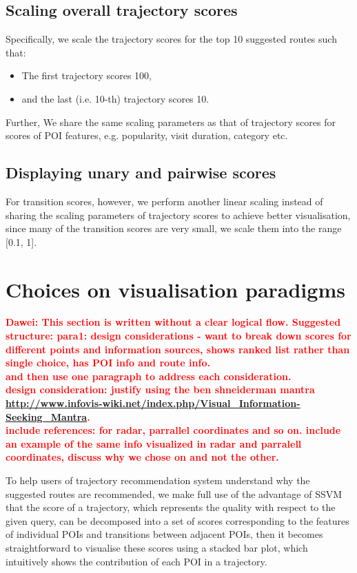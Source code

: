 \documentclass[sigconf]{acmart}
\newcommand{\TODO}[1]{\textcolor{red}{\bf{#1}}}
\begin{document}
\subsection{Scaling overall trajectory scores}
Specifically, we scale the trajectory scores for the top 10 suggested routes such that:
\begin{itemize}
\item The first trajectory scores 100,
\item and the last (i.e. 10-th) trajectory scores 10.
\end{itemize}
Further, 
We share the same scaling parameters as that of trajectory scores for scores of POI features, e.g. popularity, visit duration, category etc.

\subsection{Displaying unary and pairwise scores}

For transition scores, however, 
we perform another linear scaling instead of sharing the scaling parameters of trajectory scores to achieve better visualisation,
since many of the transition scores are very small, we scale them into the range [0.1, 1].



\section{Choices on visualisation paradigms}

\TODO{Dawei: This section is written without a clear logical flow. Suggested structure:
para1: design considerations - want to break down scores for different points and information sources, shows ranked list rather than single choice, has POI info and route info.\\
and then use one paragraph to address each consideration. \\
design consideration: justify using the ben shneiderman mantra \url{http://www.infovis-wiki.net/index.php/Visual_Information-Seeking_Mantra}.\\
include references: for radar, parrallel coordinates and so on. include an example of the same info visualized in radar and parralell coordinates, discuss why we chose on and not the other. }

To help users of trajectory recommendation system understand why the suggested routes are recommended,
we make full use of the advantage of SSVM that the score of a trajectory, 
which represents the quality with respect to the given query, 
can be decomposed into a set of scores corresponding to the features of individual POIs and transitions between adjacent POIs, then it becomes straightforward to visualise these scores using a stacked bar plot,
which intuitively shows the contribution of each POI in a trajectory.
\end{document}
